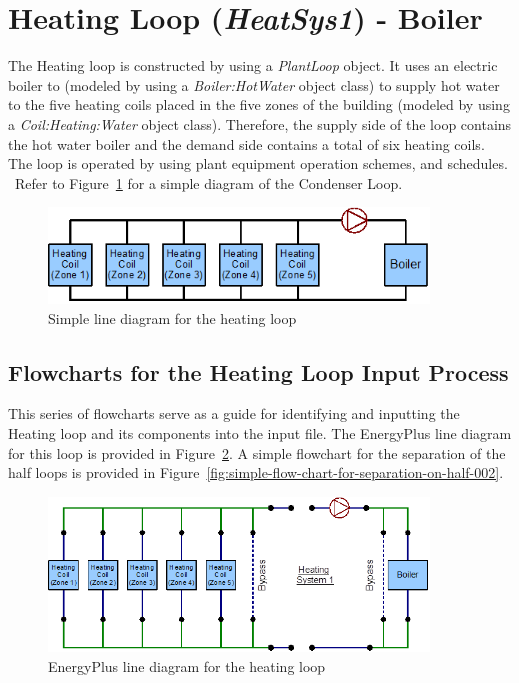 \section{Heating Loop (\emph{HeatSys1}) - Boiler}\label{heating-loop-heatsys1---boiler}

The Heating loop is constructed by using a \emph{PlantLoop} object. It uses an electric boiler to (modeled by using a \emph{Boiler:HotWater} object class) to supply hot water to the five heating coils placed in the five zones of the building (modeled by using a \emph{Coil:Heating:Water} object class). Therefore, the supply side of the loop contains the hot water boiler and the demand side contains a total of six heating coils. The loop is operated by using plant equipment operation schemes, and schedules. ~Refer to Figure~\ref{fig:simple-line-diagram-for-the-heating-loop} for a simple diagram of the Condenser Loop.

\begin{figure}[hbtp] %
\centering
\includegraphics[width=0.9\textwidth, height=0.9\textheight, keepaspectratio=true]{media/image074.png}
\caption{Simple line diagram for the heating loop \protect \label{fig:simple-line-diagram-for-the-heating-loop}}
\end{figure}

\subsection{Flowcharts for the Heating Loop Input Process}\label{flowcharts-for-the-heating-loop-input-process}

This series of flowcharts serve as a guide for identifying and inputting the Heating loop and its components into the input file. The EnergyPlus line diagram for this loop is provided in Figure~\ref{fig:energyplus-line-diagram-for-the-heating-loop}. A simple flowchart for the separation of the half loops is provided in Figure~\ref{fig:simple-flow-chart-for-separation-on-half-002}.

\begin{figure}[hbtp] %
\centering
\includegraphics[width=0.9\textwidth, height=0.9\textheight, keepaspectratio=true]{media/image075.png}
\caption{EnergyPlus line diagram for the heating loop \protect \label{fig:energyplus-line-diagram-for-the-heating-loop}}
\end{figure}

